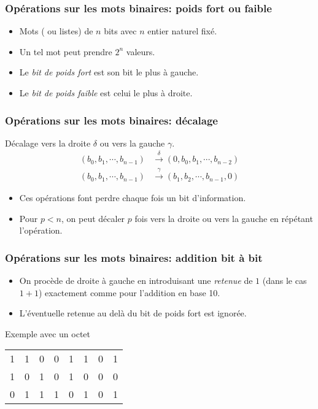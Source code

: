 



\begin{frame}
  \frametitle{Opérations sur les mots binaires: poids fort ou faible}
\begin{itemize}
  \item Mots ( ou listes) de $n$ bits avec $n$ entier naturel fixé.
  \item Un tel mot peut prendre $2^n$ valeurs.
  \item Le \emph{bit de poids fort} est son bit le plus à gauche.
  \item Le \emph{bit de poids faible} est celui le plus à droite.
\end{itemize}
\end{frame}

\begin{frame}
  \frametitle{Opérations sur les mots binaires: décalage}
Décalage vers la droite $\delta$ ou vers la gauche $\gamma$.
  \begin{align*}
    (b_0,b_1,\cdots,b_{n-1}) &\xrightarrow{\delta} (0, b_0,b_1,\cdots,b_{n-2}) \\
    (b_0,b_1,\cdots,b_{n-1}) &\xrightarrow{\gamma} (b_1,b_2,\cdots,b_{n-1}, 0)
  \end{align*}
\begin{itemize}
  \item Ces opérations font perdre chaque fois un bit d'information.
  \item Pour $p<n$, on peut décaler $p$ fois vers la droite ou vers la gauche en répétant l'opération.
\end{itemize}
\end{frame}

\begin{frame}
  \frametitle{Opérations sur les mots binaires: addition bit à bit} 
\begin{itemize}
  \item On procède de droite à gauche en introduisant une \emph{retenue} de $1$ (dans le cas $1+1$) exactement comme pour l'addition en base 10.
  \item L'éventuelle retenue au delà du bit de poids fort est ignorée.
\end{itemize}
  Exemple avec un octet
  \begin{center}
  \begin{tabular}{cccccccc}
    1 & 1 & 0 & 0 & 1 & 1 & 0 & 1 \\ 
    1 & 0 & 1 & 0 & 1 & 0 & 0 & 0 \\ \hline
    0 & 1 & 1 & 1 & 0 & 1 & 0 & 1 \\ 
  \end{tabular}    
  \end{center}
\end{frame}

